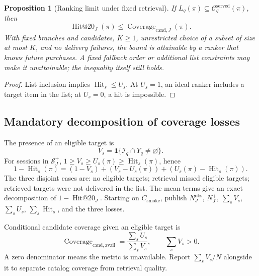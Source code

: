\documentclass[12pt,a4paper]{article}
\newcommand{\ind}{\mathbf 1}
\theoremstyle{plainru}
\newtheorem{proposition}{Proposition}[section]
\begin{document}
\begin{proposition}[Ranking limit under fixed retrieval]
\label{prop:eval-bound}
If $L_q(\pi)\subseteq\mathcal C_q^{\mathrm{served}}(\pi)$, then
\begin{equation}\label{eq:eval-candidate-bound}
 \operatorname{Hit@20}_J(\pi)
 \le\operatorname{Coverage}_{\mathrm{cand},J}(\pi).
\end{equation}
With fixed branches and candidates, $K\ge1$, unrestricted choice
of a subset of size at most $K$, and no delivery failures, the bound
is attainable by a ranker that knows future purchases. A fixed fallback order
or additional list constraints may make it unattainable;
the inequality itself still holds.
\end{proposition}

\begin{proof}
List inclusion implies $\operatorname{Hit}_s\le U_s$.
At $U_s=1$, an ideal ranker includes a target item in the list;
at $U_s=0$, a hit is impossible.
\end{proof}

\subsection{Mandatory decomposition of coverage losses}
\label{sec:eval-loss-diagnosis}

The presence of an eligible target is
\begin{equation}\label{eq:eval-available-hit}
V_s=\ind\{\mathcal I_q\cap Y_q\ne\varnothing\}.
\end{equation}
For sessions in $\mathcal S_J^+$,
$1\ge V_s\ge U_s(\pi)\ge\operatorname{Hit}_s(\pi)$, hence
\begin{equation}\label{eq:eval-loss-decomposition}
1-\operatorname{Hit}_s(\pi)
=(1-V_s)+(V_s-U_s(\pi))+(U_s(\pi)-\operatorname{Hit}_s(\pi)).
\end{equation}
The three disjoint cases are: no eligible targets; retrieval missed
eligible targets; retrieved targets were not delivered in the list.
The mean terms give an exact decomposition of $1-\operatorname{Hit@20}_J$.
Starting on $C_{\mathrm{smoke}}$, publish $N_J^{\mathrm{obs}}$, $N_J^+$,
$\sum_sV_s$, $\sum_sU_s$, $\sum_s\operatorname{Hit}_s$, and the three losses.

Conditional candidate coverage given an eligible target is
\begin{equation}\label{eq:eval-candidate-conditional}
\operatorname{Coverage}_{\mathrm{cand,avail}}
=\frac{\sum_sU_s}{\sum_sV_s},\qquad \sum_sV_s>0.
\end{equation}
A zero denominator means the metric is unavailable.
Report $\sum_sV_s/N$ alongside it to separate catalog coverage
from retrieval quality.
\end{document}
